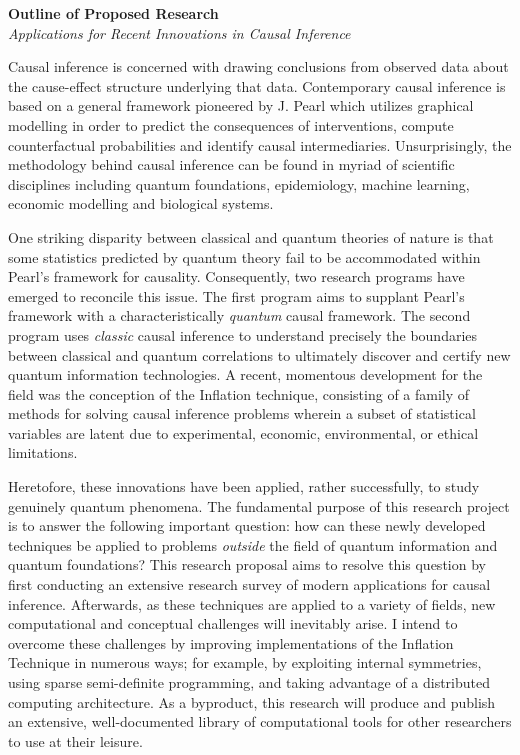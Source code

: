 \documentclass[12pt]{article}
\begin{document}
\begin{center}
    \textbf{Outline of Proposed Research} \\
    \textit{Applications for Recent Innovations in Causal Inference}
\end{center}

Causal inference is concerned with drawing conclusions from observed data about the cause-effect structure underlying that data. Contemporary causal inference is based on a general framework pioneered by J. Pearl which utilizes graphical modelling in order to predict the consequences of interventions, compute counterfactual probabilities and identify causal intermediaries. Unsurprisingly, the methodology behind causal inference can be found in myriad of scientific disciplines including quantum foundations, epidemiology, machine learning, economic modelling and biological systems.

One striking disparity between classical and quantum theories of nature is that some statistics predicted by quantum theory fail to be accommodated within Pearl's framework for causality. Consequently, two research programs have emerged to reconcile this issue. The first program aims to supplant Pearl's framework with a characteristically \textit{quantum} causal framework. The second program uses \textit{classic} causal inference to understand precisely the boundaries between classical and quantum correlations to ultimately discover and certify new quantum information technologies. A recent, momentous development for the field was the conception of the Inflation technique, consisting of a family of methods for solving causal inference problems wherein a subset of statistical variables are latent due to experimental, economic, environmental, or ethical limitations.

Heretofore, these innovations have been applied, rather successfully, to study genuinely quantum phenomena. The fundamental purpose of this research project is to answer the following important question: how can these newly developed techniques be applied to problems \textit{outside} the field of quantum information and quantum foundations? This research proposal aims to resolve this question by first conducting an extensive research survey of modern applications for causal inference. Afterwards, as these techniques are applied to a variety of fields, new computational and conceptual challenges will inevitably arise. I intend to overcome these challenges by improving implementations of the Inflation Technique in numerous ways; for example, by exploiting internal symmetries, using sparse semi-definite programming, and taking advantage of a distributed computing architecture. As a byproduct, this research will produce and publish an extensive, well-documented library of computational tools for other researchers to use at their leisure.
\end{document}
